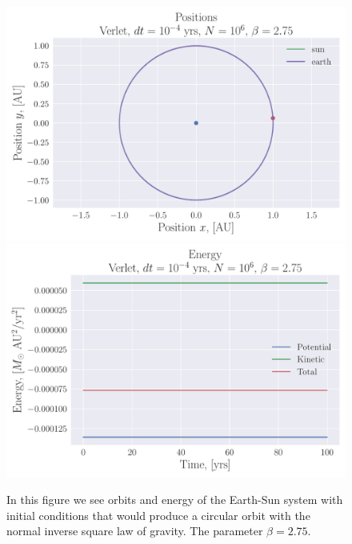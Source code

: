 \documentclass[reprint, english,notitlepage,nofootinbib]{revtex4-1}  %
\begin{document}
\begin{figure}[h]
	\centering
	\includegraphics[width=\linewidth]{../output/earth_sun_circ-verlet-4-6-2_75.pdf}
  \includegraphics[width=\linewidth]{../output/earth_sun_circ-verlet-4-6-2_75_energy.pdf}
	\caption{In this figure we see orbits and energy of the Earth-Sun system with initial conditions that would produce a circular orbit with the normal inverse square law of gravity. The parameter $\beta = 2.75$.}
	\label{fig:earth_sun_circ_beta=2_75}
\end{figure}
\end{document}

